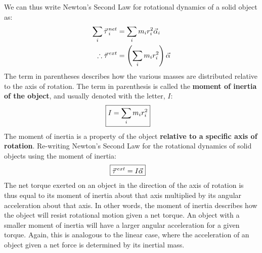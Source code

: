 We can thus write Newton's Second Law for rotational dynamics of a solid object as:
\begin{align*}
\sum_i \pvec\tau_i^{net} &= \sum_i  m_ir_i^2\vec\alpha_i\\
\therefore \pvec\tau^{ext}&= \left(\sum_i  m_ir_i^2\right)\vec\alpha
\end{align*}
The term in parentheses describes how the various masses are distributed relative to the axis of rotation. The term in parenthesis is called the \textbf{moment of inertia of the object}, and usually denoted with the letter, $I$:
\begin{align}
\Aboxed{I = \sum_i  m_ir_i^2}
\end{align}
The moment of inertia is a property of the object \textbf{relative to a specific axis of rotation}. Re-writing Newton's Second Law for the rotational dynamics of solid objects using the moment of inertia:
\begin{align}
\Aboxed{\pvec\tau^{ext}&= I\vec\alpha}
\end{align}
The net torque exerted on an object in the direction of the axis of rotation is thus equal to its moment of inertia about that axis multiplied by its angular acceleration about that axis. In other words, the moment of inertia describes how the object will resist rotational motion given a net torque. An object with a smaller moment of inertia will have a larger angular acceleration for a given torque. Again, this is analogous to the linear case, where the acceleration of an object given a net force is determined by its inertial mass.
